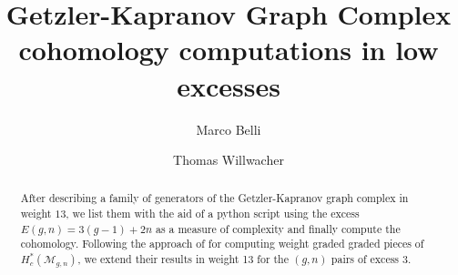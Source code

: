 \documentclass[12pt]{amsart}
\author{Marco Belli}
\author{Thomas Willwacher}
\title{Getzler-Kapranov Graph Complex cohomology computations in low excesses}
\theoremstyle{definition}
\numberwithin{equation}{section}
\newcommand{\M}{\mathcal{M}}
\theoremstyle{definition} %
\theoremstyle{remark}
\begin{document}
\begin{abstract}
    After describing a family of generators of the Getzler-Kapranov graph complex in weight $13$, we list them with the aid of a python script using the excess $E(g,n)=3(g-1)+2n$ as a measure of complexity and finally compute the cohomology. Following the approach of \cite{CLPW2} for computing weight graded graded pieces of $H^*_c(\M_{g,n})$, we extend their results in weight 13 for the $(g,n)$ pairs of excess $3$.
\end{abstract}

\maketitle





%


%








\end{document}
